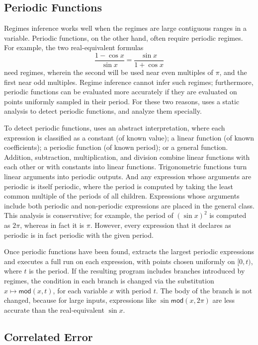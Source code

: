 \documentclass[paper.tex]{subfiles}
\begin{document}
\subsection{Periodic Functions}

Regimes inference works well when the regimes
  are large contiguous ranges in a variable.
Periodic functions, on the other hand, often require periodic regimes.
For example, the two real-equivalent formulas
\[
\frac{1 - \cos x}{\sin x} = \frac{\sin x}{1 + \cos x}
\]
  need regimes, wherein the second will be used
  near even multiples of $\pi$, and the first near odd multiples.
Regime inference cannot infer such regimes; furthermore,
  periodic functions can be evaluated more accurately
  if they are evaluated on points uniformly sampled in their period.
For these two reasons, \casio uses a static analysis
  to detect periodic functions, and analyze them specially.

To detect periodic functions, \casio uses an abstract interpretation,
  where each expression is classified as
  a constant (of known value); a linear function (of known coefficients);
  a periodic function (of known period); or a general function.
Addition, subtraction, multiplication, and division
  combine linear functions with each other or with constants
  into linear functions.
Trigonometric functions turn linear arguments
  into periodic outputs.
And any expression whose arguments are periodic
  is itself periodic, where the period is computed
  by taking the least common multiple of the periods of all children.
Expressions whose arguments include
  both periodic and non-periodic expressions
  are placed in the general class.
This analysis is conservative; for example, the period of $(\sin x)^2$
  is computed as $2 \pi$, whereas in fact it is $\pi$.
However, every expression that it declares as periodic
  is in fact periodic with the given period.

Once periodic functions have been found,
  \casio extracts the largest periodic expressions
  and executes a full \casio run on each expression,
  with points chosen uniformly on $[0, t)$,
  where $t$ is the period.
If the resulting program includes branches introduced by regimes,
  the condition in each branch is changed via the substitution
  $x \mapsto \mathsf{mod}(x, t)$, for each variable $x$ with period $t$.
The body of the branch is not changed,
  because for large inputs, expressions like
  $\sin \mathsf{mod}(x, 2\pi)$
  are less accurate than the real-equivalent $\sin x$.

\subsection{Correlated Error}
\end{document}
